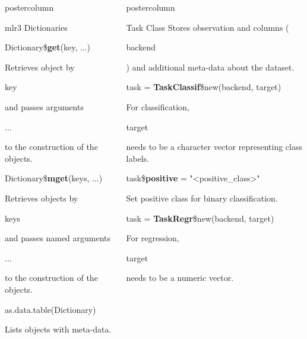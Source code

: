 \documentclass{beamer}
\newlength{\columnheight} %
\newcommand{\codeinline}[1]{\begin{codeboxinline}#1\end{codeboxinline}}
\begin{document}
\begin{frame}[fragile]{}
\begin{columns}
\begin{column}{.245\textwidth}
\begin{beamercolorbox}[center]{postercolumn}
\begin{minipage}{.98\textwidth}
{\begin{myblock}{mlr3 Dictionaries}
							\begin{codebox}
								Dictionary\$\textbf{get}(key, ...)
							\end{codebox}
							Retrieves object by \codeinline{key} and 
							passes arguments \codeinline{...} to the construction of the objects.
							\\
							\begin{codebox}
								Dictionary\$\textbf{mget}(keys, ...)
							\end{codebox}
							Retrieves objects by \codeinline{keys} and 
							passes named arguments \codeinline{...} to the construction of the objects. 
							\\
							\begin{codebox}
								as.data.table(Dictionary)
							\end{codebox}
							Lists objects with meta-data.
						\end{myblock}
					\vfill}
				\end{minipage}
			\end{beamercolorbox}
		\end{column}
		\begin{column}{.245\textwidth}
			\begin{beamercolorbox}[center]{postercolumn}
				\begin{minipage}{.98\textwidth}
					\parbox[t][\columnheight]{\textwidth}{
						\begin{myblock}{Task Class}
							Stores observation and columns (\codeinline{backend}) and additional
							meta-data about the dataset.
							\\
							\begin{codebox}
								task = \textbf{TaskClassif}\$new(backend, target)
							\end{codebox}
							For classification, \codeinline{target} needs to be a character vector representing class labels.
							\\
							\begin{codebox}
								task\$\textbf{positive} = "<positive\_class>"
							\end{codebox}
							Set positive class for binary classification.
							\\
							\begin{codebox}
								task = \textbf{TaskRegr}\$new(backend, target)
							\end{codebox}
							For regression, \codeinline{target} needs to be a numeric vector.
							\vspace{1em}
							\\

\end{myblock}}
\end{minipage}
\end{beamercolorbox}
\end{column}
\end{columns}
\end{frame}
\end{document}
